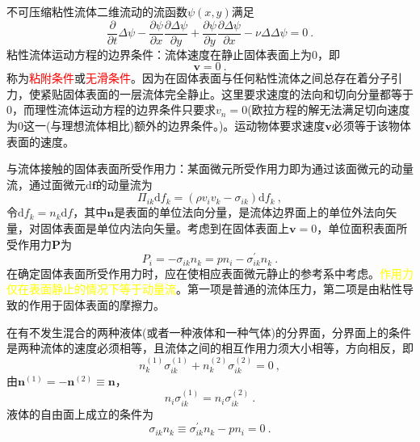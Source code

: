 \documentclass[12pt,a4paper]{article}
\renewcommand{\vec}[1]{\boldsymbol{#1}}
\newcommand{\dif}{\mathrm{d}}
\begin{document}
不可压缩粘性流体二维流动的流函数$\psi(x, y)$满足
\begin{equation}
\frac{\partial }{\partial t} \Delta \psi -\frac{\partial \psi}{\partial x} \frac{\partial \Delta \psi}{\partial y} +\frac{\partial \psi}{\partial y} \frac{\partial \Delta \psi}{\partial x} -\nu \Delta \Delta \psi = 0 ~.
\end{equation}
粘性流体运动方程的边界条件：流体速度在静止固体表面上为$0$，即
\begin{equation}
\vec{v} = 0 ~.
\end{equation}
称为\textcolor{red}{粘附条件}或\textcolor{red}{无滑条件}。因为在固体表面与任何粘性流体之间总存在着分子引力，使紧贴固体表面的一层流体完全静止。这里要求速度的法向和切向分量都等于$0$，而理性流体运动方程的边界条件只要求$v_n = 0$(欧拉方程的解无法满足切向速度为$0$这一(与理想流体相比)额外的边界条件。)。运动物体要求速度$\vec{v}$必须等于该物体表面的速度。

与流体接触的固体表面所受作用力：某面微元所受作用力即为通过该面微元的动量流，通过面微元$\dif \vec{f}$的动量流为
\begin{equation*}
\Pi_{ik} \dif f_k = (\rho v_i v_k -\sigma_{ik}) \dif f_k ~,
\end{equation*}
令$\dif f_k = n_k \dif f$，其中$\vec{n}$是表面的单位法向分量，是流体边界面上的单位外法向矢量，对固体表面是单位内法向矢量。考虑到在固体表面上$\vec{v} = 0$，单位面积表面所受作用力$\vec{P}$为
\begin{equation}
P_i = -\sigma_{ik} n_k = pn_i -\sigma_{ik}^\prime n_k ~.
\end{equation}
在确定固体表面所受作用力时，应在使相应表面微元静止的参考系中考虑。\textcolor{yellow}{作用力仅在表面静止的情况下等于动量流}。第一项是普通的流体压力，第二项是由粘性导致的作用于固体表面的摩擦力。

在有不发生混合的两种液体(或者一种液体和一种气体)的分界面，分界面上的条件是两种流体的速度必须相等，且流体之间的相互作用力须大小相等，方向相反，即
\begin{equation*}
n_k^{(1)} \sigma_{ik}^{(1)} +n_k^{(2)} \sigma_{ik}^{(2)} = 0 ~,
\end{equation*}
由$\vec{n}^{(1)} = -\vec{n}^{(2)} \equiv \vec{n}$，
\begin{equation}
n_i \sigma_{ik}^{(1)} = n_i \sigma_{ik}^{(2)} ~.
\end{equation}
液体的自由面上成立的条件为
\begin{equation}
\sigma_{ik} n_k \equiv \sigma_{ik}^\prime n_k -p n_i = 0 ~.
\end{equation}
\end{document}
